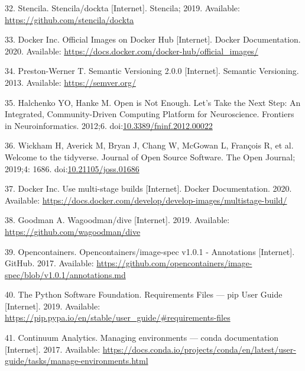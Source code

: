 \documentclass[10pt,letterpaper]{article}
\begin{document}
\leavevmode\hypertarget{ref-stencila_dockta_2019}{}%
32. Stencila. Stencila/dockta {[}Internet{]}. Stencila; 2019. Available:
\url{https://github.com/stencila/dockta}

\leavevmode\hypertarget{ref-docker_inc_official_2020}{}%
33. Docker Inc. Official Images on Docker Hub {[}Internet{]}. Docker
Documentation. 2020. Available:
\url{https://docs.docker.com/docker-hub/official_images/}

\leavevmode\hypertarget{ref-preston-werner_semantic_2013}{}%
34. Preston-Werner T. Semantic Versioning 2.0.0 {[}Internet{]}. Semantic
Versioning. 2013. Available: \url{https://semver.org/}

\leavevmode\hypertarget{ref-halchenko_open_2012}{}%
35. Halchenko YO, Hanke M. Open is Not Enough. Let's Take the Next Step:
An Integrated, Community-Driven Computing Platform for Neuroscience.
Frontiers in Neuroinformatics. 2012;6.
doi:\href{https://doi.org/10.3389/fninf.2012.00022}{10.3389/fninf.2012.00022}

\leavevmode\hypertarget{ref-Wickham2019}{}%
36. Wickham H, Averick M, Bryan J, Chang W, McGowan L, François R, et
al. Welcome to the tidyverse. Journal of Open Source Software. The Open
Journal; 2019;4: 1686.
doi:\href{https://doi.org/10.21105/joss.01686}{10.21105/joss.01686}

\leavevmode\hypertarget{ref-docker_multi-stage_2020}{}%
37. Docker Inc. Use multi-stage builds {[}Internet{]}. Docker
Documentation. 2020. Available:
\url{https://docs.docker.com/develop/develop-images/multistage-build/}

\leavevmode\hypertarget{ref-goodman_dive_2019}{}%
38. Goodman A. Wagoodman/dive {[}Internet{]}. 2019. Available:
\url{https://github.com/wagoodman/dive}

\leavevmode\hypertarget{ref-opencontainers_image-spec_2017}{}%
39. Opencontainers. Opencontainers/image-spec v1.0.1 - Annotations
{[}Internet{]}. GitHub. 2017. Available:
\url{https://github.com/opencontainers/image-spec/blob/v1.0.1/annotations.md}

\leavevmode\hypertarget{ref-the_python_software_foundation_requirements_2019}{}%
40. The Python Software Foundation. Requirements Files --- pip User
Guide {[}Internet{]}. 2019. Available:
\url{https://pip.pypa.io/en/stable/user_guide/\#requirements-files}

\leavevmode\hypertarget{ref-continuum_analytics_managing_2017}{}%
41. Continuum Analytics. Managing environments --- conda documentation
{[}Internet{]}. 2017. Available:
\url{https://docs.conda.io/projects/conda/en/latest/user-guide/tasks/manage-environments.html}
\end{document}
